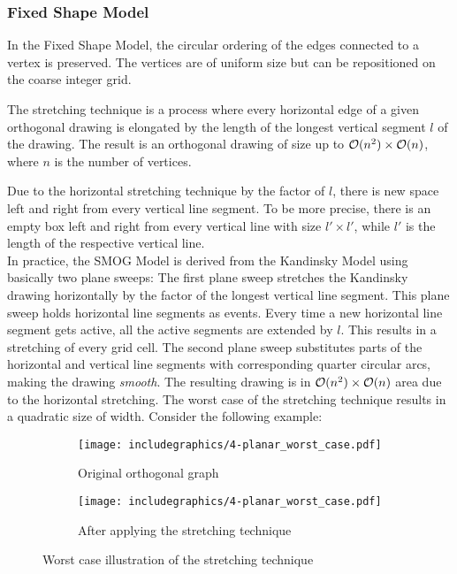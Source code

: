 \subsubsection{Fixed Shape Model}
In the Fixed Shape Model, the circular ordering of the edges connected to a vertex is preserved. The vertices are of uniform size but can be repositioned on the coarse integer grid. 
\begin{definition}
	The stretching technique is a process where every horizontal edge of a given orthogonal drawing is elongated by the length of the longest vertical segment $l$ of the drawing. The result is an orthogonal drawing of size up to $\mathcal{O}(n^2) \times \mathcal{O}(n)$, where $n$ is the number of vertices.
\end{definition}
Due to the horizontal stretching technique by the factor of $l$, there is new space left and right from every vertical line segment. To be more precise, there is an empty box left and right from every vertical line with size $l'\times l'$, while $l'$ is the length of the respective vertical line.\cite[p. 583, Figure 5]{SMOG}\\
In practice, the SMOG Model is derived from the Kandinsky Model using basically two plane sweeps: The first plane sweep stretches the Kandinsky drawing horizontally by the factor of the longest vertical line segment. This plane sweep holds horizontal line segments as events. Every time a new horizontal line segment gets active, all the active segments are extended by $l$. This results in a stretching of every grid cell. The second plane sweep substitutes parts of the horizontal and vertical line segments with corresponding quarter circular arcs, making the drawing \textit{smooth}. The resulting drawing is in $\mathcal{O}(n^2) \times \mathcal{O}(n)$ area due to the horizontal stretching.
The worst case of the stretching technique results in a quadratic size of width. Consider the following example:
\begin{figure}[H]
	\centering
	\begin{subfigure}{.4\textwidth}
		\centering
		\texttt{[image: includegraphics/4-planar\_worst\_case.pdf]}
		\caption{Original orthogonal graph}	
	\end{subfigure}
	\begin{subfigure}{.6\textwidth}
		\centering
		\texttt{[image: includegraphics/4-planar\_worst\_case.pdf]}
		\caption{After applying the stretching technique}
	\end{subfigure}
	\caption{Worst case illustration of the stretching technique}\label{im:4-planar_worst_case}
\end{figure}
